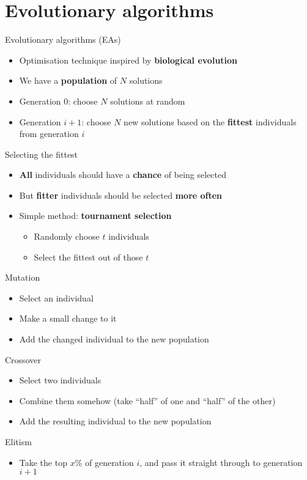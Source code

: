 \part{Evolutionary algorithms}
\frame{\partpage}

\begin{frame}{Evolutionary algorithms (EAs)}
	\begin{itemize}
		\pause\item Optimisation technique inspired by \textbf{biological evolution}
		\pause\item We have a \textbf{population} of $N$ solutions
		\pause\item Generation $0$: choose $N$ solutions at random
		\pause\item Generation $i+1$: choose $N$ new solutions based on the \textbf{fittest} individuals from generation $i$
	\end{itemize}
\end{frame}

\begin{frame}{Selecting the fittest}
	\begin{itemize}
		\pause\item \textbf{All} individuals should have a \textbf{chance} of being selected
		\pause\item But \textbf{fitter} individuals should be selected \textbf{more often}
		\pause\item Simple method: \textbf{tournament selection}
			\begin{itemize}
				\pause\item Randomly choose $t$ individuals
				\pause\item Select the fittest out of those $t$
			\end{itemize}
	\end{itemize}
\end{frame}

\begin{frame}{Mutation}
	\begin{itemize}
		\pause\item Select an individual
		\pause\item Make a small change to it
		\pause\item Add the changed individual to the new population
	\end{itemize}
\end{frame}

\begin{frame}{Crossover}
	\begin{itemize}
		\pause\item Select two individuals
		\pause\item Combine them somehow (take ``half'' of one and ``half'' of the other)
		\pause\item Add the resulting individual to the new population
	\end{itemize}
\end{frame}

\begin{frame}{Elitism}
	\begin{itemize}
		\pause\item Take the top $x\%$ of generation $i$, and pass it straight through to generation $i+1$
	\end{itemize}
\end{frame}

